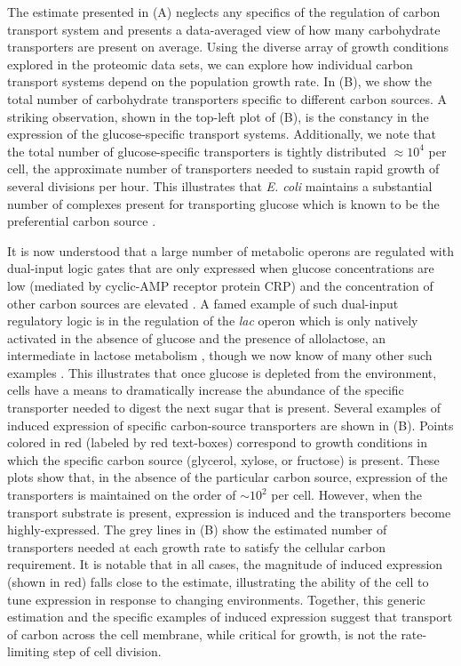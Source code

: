 The estimate presented in (A) neglects any specifics of the
regulation of carbon transport system and presents a data-averaged view of how
many carbohydrate transporters are present on average. Using the diverse array
of growth conditions explored in the proteomic data sets, we can explore how
individual carbon transport systems depend on the population growth rate. In
(B), we show the total number of carbohydrate transporters
specific to different carbon sources. A striking observation, shown in the
top-left plot of (B), is the constancy in the expression of the
glucose-specific transport systems. Additionally, we note that the total number
of glucose-specific transporters is tightly distributed $\approx 10^4$ per cell,
the approximate number of transporters needed to sustain rapid growth of several
divisions per hour. This
illustrates that \textit{E. coli} maintains a substantial number of complexes
present for transporting glucose which is known to be the preferential carbon
source \citep{monod1947, liu2005a, aidelberg2014}.

It is now understood that a large number of metabolic operons are regulated
with dual-input logic gates that are only expressed when glucose
concentrations are low (mediated by cyclic-AMP receptor protein CRP) and the
concentration of other carbon sources are elevated \citep{gama-castro2016, zhang2014a}. A
famed example of such dual-input regulatory logic is in the regulation of the
\textit{lac} operon which is only natively activated in the absence of glucose and the
presence of allolactose, an intermediate in lactose metabolism \citep{jacob1961}, though
we now know of many other such examples \citep{ireland2020, gama-castro2016,
belliveau2018}. This illustrates that once glucose is depleted from the
environment, cells have a means to dramatically increase the abundance of the
specific transporter needed to digest the next sugar that is present. Several
examples of induced expression of specific carbon-source transporters are
shown in (B). Points colored in red (labeled by red
text-boxes) correspond to growth conditions in which the specific carbon source
(glycerol, xylose, or fructose) is present. These plots show that, in the
absence of the particular carbon source, expression of the transporters is
maintained on the order of $\sim 10^2$ per cell. However, when the transport
substrate is present, expression is induced and the
transporters become highly-expressed. The grey lines in (B)
show the estimated number of transporters needed at each growth rate to satisfy
the cellular carbon requirement. It is notable that  in all cases, the magnitude
of induced expression (shown in red) falls close to the estimate, illustrating
the ability of the cell to tune expression in response to changing environments. Together, this generic estimation and the specific
examples of induced expression suggest that transport of carbon across the cell
membrane, while critical for growth, is not the rate-limiting step of cell division.

